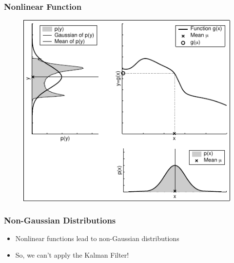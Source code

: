     \begin{frame}
    \frametitle{Nonlinear Function}
    
    \begin{figure}[!h]
    \includegraphics[width=0.5\columnwidth]{./images/nonlinear_transformation_of_a_gaussian.pdf}
    \end{figure}
    \end{frame}
    
    \begin{frame}
    \frametitle{Non-Gaussian Distributions}
    
    
    \begin{itemize}
    \item Nonlinear functions lead to non-Gaussian distributions
    \item So, we can't apply the Kalman Filter!
    \end{itemize}
    
    \end{frame}
    
